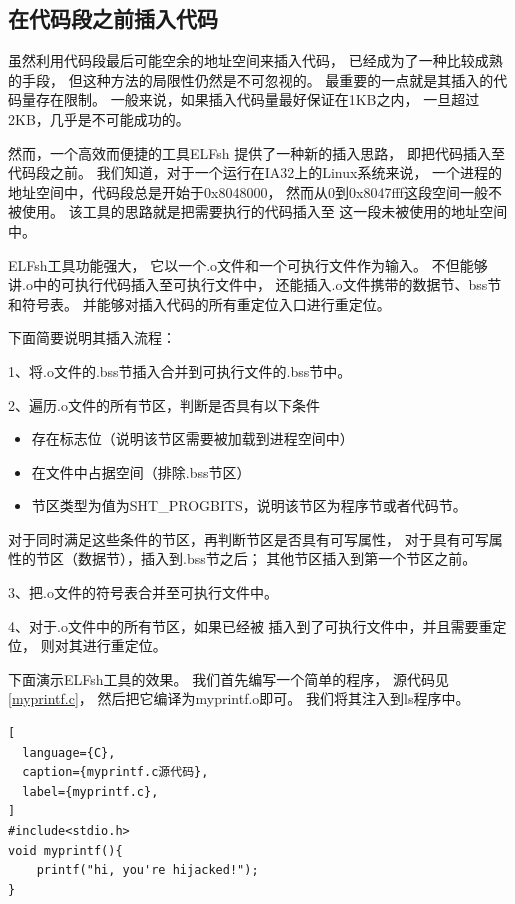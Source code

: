 
\subsection{在代码段之前插入代码}
\label{before}

虽然利用代码段最后可能空余的地址空间来插入代码，
已经成为了一种比较成熟的手段，
但这种方法的局限性仍然是不可忽视的。
最重要的一点就是其插入的代码量存在限制。
一般来说，如果插入代码量最好保证在1KB之内，
一旦超过2KB，几乎是不可能成功的。

然而，一个高效而便捷的工具ELFsh
提供了一种新的插入思路，
即把代码插入至代码段之前。
我们知道，对于一个运行在IA32上的Linux系统来说，
一个进程的地址空间中，代码段总是开始于0x8048000，
然而从0到0x8047fff这段空间一般不被使用。
该工具的思路就是把需要执行的代码插入至
这一段未被使用的地址空间中。

ELFsh工具功能强大，
它以一个.o文件和一个可执行文件作为输入。
不但能够讲.o中的可执行代码插入至可执行文件中，
还能插入.o文件携带的数据节、bss节和符号表。
并能够对插入代码的所有重定位入口进行重定位。

下面简要说明其插入流程：

1、将.o文件的.bss节插入合并到可执行文件的.bss节中。

2、遍历.o文件的所有节区，判断是否具有以下条件
\begin{itemize}
  \item 存在标志位（说明该节区需要被加载到进程空间中）
  \item 在文件中占据空间（排除.bss节区）
  \item 节区类型为值为SHT\_PROGBITS，说明该节区为程序节或者代码节。
\end{itemize}
  
对于同时满足这些条件的节区，再判断节区是否具有可写属性，
对于具有可写属性的节区（数据节），插入到.bss节之后；
其他节区插入到第一个节区之前。

3、把.o文件的符号表合并至可执行文件中。

4、对于.o文件中的所有节区，如果已经被
插入到了可执行文件中，并且需要重定位，
则对其进行重定位。

下面演示ELFsh工具的效果。
我们首先编写一个简单的程序，
源代码见\ref{myprintf.c}，
然后把它编译为myprintf.o即可。
我们将其注入到ls程序中。

\begin{lstlisting}[
  language={C},
  caption={myprintf.c源代码},
  label={myprintf.c},
]
#include<stdio.h>
void myprintf(){
    printf("hi, you're hijacked!");
}
\end{lstlisting}

